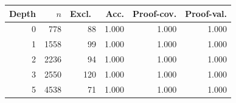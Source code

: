 \begin{tabular}{rrrrrr}
\toprule
Depth & $n$ & Excl.\ & Acc. & Proof-cov. & Proof-val. \\
\midrule
0 & 778 & 88 & 1.000 & 1.000 & 1.000 \\
1 & 1558 & 99 & 1.000 & 1.000 & 1.000 \\
2 & 2236 & 94 & 1.000 & 1.000 & 1.000 \\
3 & 2550 & 120 & 1.000 & 1.000 & 1.000 \\
5 & 4538 & 71 & 1.000 & 1.000 & 1.000 \\
\bottomrule
\end{tabular}
